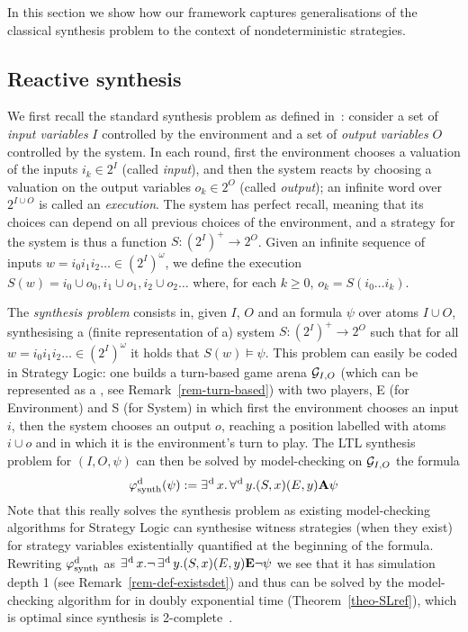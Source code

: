 In this section we show how our framework captures generalisations of
the classical \LTL synthesis problem to the context of nondeterministic strategies.

\subsection{Reactive synthesis}
\label{sec-ltl-synth}

We first recall the standard \LTL synthesis problem as defined
in~\cite{pnueli1989synthesisshort}: consider a set of \emph{input
  variables} $I$ controlled by the environment and a set of
\emph{output variables} $O$ controlled by the system. In each round,
first the environment chooses a valuation of the inputs $i_k\in 2^I$
(called \emph{input}), and then the system reacts by choosing a
valuation on the output variables $o_k\in 2^O$ (called \emph{output});
an infinite word over $2^{I\cup O}$ is called an
\emph{execution}. The system has perfect recall, meaning that its
choices can depend on all previous choices of the environment, and a
strategy for the system is thus a function $S:(2^I)^+\to 2^O$. Given
an infinite sequence of inputs $w=i_0i_1i_2\ldots \in (2^I)^\omega$, we
define the execution $S(w)=i_0\cup o_0, i_1\cup o_1, i_2\cup o_2\ldots$ where,
for each $k\geq 0$, $o_k=S(i_0\ldots i_k)$.

The \emph{\LTL synthesis problem} consists in,
given $I$, $O$ and an \LTL formula $\psi$ over atoms $I\cup O$,
synthesising a (finite representation of a) system $S:(2^I)^+\to 2^O$ such
that for all $w=i_0i_1i_2\ldots\in (2^I)^\omega$ it holds that $S(w)\models\psi$.
This problem can easily
be coded in Strategy Logic: one builds a turn-based game arena $\CGS_{I,O}$ (which
can be represented as a \CGS, see Remark~\ref{rem-turn-based}) with
two players, E (for Environment) and S (for System) in
which first the environment chooses an input $i$, then the system chooses
an output $o$, reaching a position labelled with atoms $i\cup o$ and in which it is
the environment's turn to play. The LTL synthesis problem for $(I,O,\psi)$ can
then be solved by model-checking on $\CGS_{I,O}$ the \SLref formula
\[\varphi^{\text{d}}_{\text{synth}}(\psi):=\operatorname*{\exists^{\hskip.5pt\text{d}}} x.   \operatorname*{\forall^{\hskip.5pt\text{d}}} y.
 (S,x)(E,y) {\bf A} \psi\]
 Note that this really solves the synthesis
problem as existing model-checking algorithms for Strategy Logic can
synthesise  witness strategies (when they exist) for strategy variables existentially
quantified at the beginning of the formula.
Rewriting $\varphi^{\text{d}}_{\text{synth}}$ as $\operatorname*{\exists^{\hskip.5pt\text{d}}} x. \neg  \operatorname*{\exists^{\hskip.5pt\text{d}}}  y.
 (S,x)(E,y) {\bf E} \neg \psi$
we see that it has simulation depth 1 (see
Remark~\ref{rem-def-existsdet}) and thus can be solved by the
model-checking algorithm for \SLref in doubly
exponential time (Theorem~\ref{theo-SLref}), which is optimal since
\LTL synthesis is 2\EXPTIME-complete~\cite{pnueli1989synthesisshort}.

